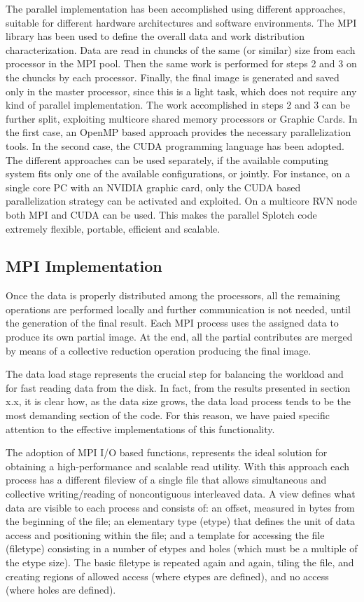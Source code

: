 The parallel implementation has been accomplished using different approaches, suitable 
for different hardware architectures and software environments. The MPI library \cite{mpi} 
has been used to define the overall data and work distribution characterization. Data are
read in chuncks of the same (or similar) size from each processor in the MPI pool. Then 
the same work is performed for steps 2 and 3 on the chuncks by each processor. Finally,
the final image is generated and saved only in the master processor, since this is a 
light task, which does not require any kind of parallel implementation. The work accomplished
in steps 2 and 3 can be further split, exploiting multicore shared memory processors or Graphic Cards.
In the first case, an OpenMP \cite{openmp} based approach provides the necessary parallelization tools. 
In the second case, the CUDA \cite{cuda} programming language has been adopted. The different approaches
can be used separately, if the available computing system fits only one of the available 
configurations, or jointly. For instance, on a single core PC with an NVIDIA graphic card, 
only the CUDA based parallelization strategy can be activated and exploited. On a multicore
RVN \cite{rvn} node both MPI and CUDA can be used. This makes the parallel Splotch code extremely 
flexible, portable, efficient and scalable.


\subsection{MPI Implementation}
\label{mpi}

Once the data is properly distributed among the processors, all the remaining operations 
are performed locally and further communication is not needed, until the generation
of the final result. Each MPI process uses the assigned 
data to produce its own partial image. At the end, all the partial contributes are merged by means of a 
collective reduction operation producing the final image. 

The data load stage represents the crucial step for balancing the workload and for fast reading 
data from the disk. In fact, from the results presented in section x.x, it is clear how,
as the data size grows,
the data load process tends to be the most demanding section of the code. For this reason,
we have paied specific attention to the effective implementations of this functionality.

The adoption of MPI I/O based functions, represents the ideal solution for obtaining 
a high-performance and scalable read utility. 
With this approach each process has a different fileview of a single file that allows simultaneous and collective
writing/reading of noncontiguous interleaved data. A view defines what data are visible to each process and 
consists of: an offset, measured in bytes from the beginning of the file; an elementary type (etype) that 
defines the unit of data access and positioning within the file; and a template for accessing the file (filetype)
consisting in a number of etypes and holes (which must be a multiple of the etype size). 
The basic filetype is repeated again and again, tiling the file, and creating regions of allowed access 
(where etypes are defined), and no access (where holes are defined).

